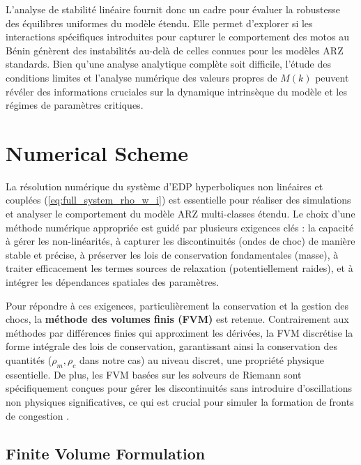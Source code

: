 L'analyse de stabilité linéaire fournit donc un cadre pour évaluer la robustesse des équilibres uniformes du modèle étendu. Elle permet d'explorer si les interactions spécifiques introduites pour capturer le comportement des motos au Bénin génèrent des instabilités au-delà de celles connues pour les modèles ARZ standards. Bien qu'une analyse analytique complète soit difficile, l'étude des conditions limites et l'analyse numérique des valeurs propres de \( M(k) \) peuvent révéler des informations cruciales sur la dynamique intrinsèque du modèle et les régimes de paramètres critiques.

\section{Numerical Scheme}
\label{sec:numerical_scheme}

La résolution numérique du système d'EDP hyperboliques non linéaires et couplées (\ref{eq:full_system_rho_w_i}) est essentielle pour réaliser des simulations et analyser le comportement du modèle ARZ multi-classes étendu. Le choix d'une méthode numérique appropriée est guidé par plusieurs exigences clés : la capacité à gérer les non-linéarités, à capturer les discontinuités (ondes de choc) de manière stable et précise, à préserver les lois de conservation fondamentales (masse), à traiter efficacement les termes sources de relaxation (potentiellement raides), et à intégrer les dépendances spatiales des paramètres.

Pour répondre à ces exigences, particulièrement la conservation et la gestion des chocs, la \textbf{méthode des volumes finis (FVM)} est retenue. Contrairement aux méthodes par différences finies qui approximent les dérivées, la FVM discrétise la forme intégrale des lois de conservation, garantissant ainsi la conservation des quantités (\(\rho_m, \rho_c\) dans notre cas) au niveau discret, une propriété physique essentielle. De plus, les FVM basées sur les solveurs de Riemann sont spécifiquement conçues pour gérer les discontinuités sans introduire d'oscillations non physiques significatives, ce qui est crucial pour simuler la formation de fronts de congestion \cite{LeVeque2002, Toro2009}.

\subsection{Finite Volume Formulation}
\label{subsec:fvm_formulation}

